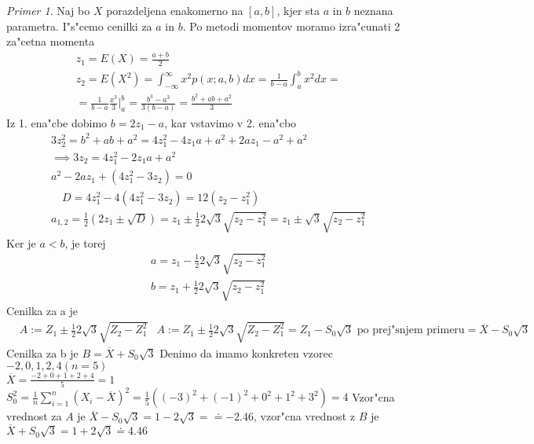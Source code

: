 \documentclass[a4paper,12pt]{article}
\theoremstyle{definition}
\theoremstyle{remark}
\newtheorem*{ex}{Primer}
\begin{document}
\begin{ex}
    Naj bo $X$ porazdeljena enakomerno na $[a,b]$, kjer sta $a$ in $b$ neznana parametra. I"s"cemo cenilki za $a$
    in $b$. Po metodi momentov moramo izra"cunati 2 za"cetna momenta
    \begin{align*}
        &z_1 = E(X) = \frac{a+b}{2} \\
        &z_2 = E(X^2) = \int_{-\infty}^{\infty} x^2 p(x; a, b) dx = \frac{1}{b-a} \int_{a}^{b} x^2 dx = \\
        &= \frac{1}{b-a} \frac{x^3}{3} \vert_a^b = \frac{b^3-a^3}{3(b-a)} = \frac{b^2 + ab + a^2}{3}
    \end{align*}
    Iz 1. ena"cbe dobimo $b = 2z_1 - a$, kar vstavimo v 2. ena"cbo
    \begin{align*}
        &3z_2^2 = b^2 + ab + a^2 = 4z_1^2 - 4z_1 a + a^2 + 2a z_1 - a^2 + a^2 \\
        &\implies 3z_2 = 4z_1^2 - 2z_1 a + a^2 \\
        &a^2 - 2a z_1 + (4z_1^2 - 3z_2) = 0 \\
        &\quad D = 4z_1^2 - 4(4z_1^2 - 3z_2) = 12(z_2 - z_1^2) \\
        &a_{1,2} = \frac{1}{2} (2z_1 \pm \sqrt{D}) = z_1 \pm \frac{1}{2} 2\sqrt{3} \sqrt{z_2 - z_1^2} =
            z_1 \pm \sqrt{3} \sqrt{z_2 - z_1^2}
    \end{align*}
    Ker je $a < b$, je torej
    \begin{align*}
        &a = z_1 - \frac{1}{2} 2\sqrt{3} \sqrt{z_2 - z_1^2} \\
        &b = z_1 + \frac{1}{2} 2\sqrt{3} \sqrt{z_2 - z_1^2}
    \end{align*}
    Cenilka za a je
    \begin{align*}
        &A := Z_1 \pm \frac{1}{2} 2\sqrt{3} \sqrt{Z_2 - Z_1^2}
        &A := Z_1 \pm \frac{1}{2} 2\sqrt{3} \sqrt{Z_2 - Z_1^2} = Z_1 - S_0 \sqrt{3} \text{ po prej"snjem primeru}
            = \overline{X} - S_0 \sqrt{3}
    \end{align*}
    Cenilka za b je $B = \overline{X} + S_0 \sqrt{3}$
    Denimo da imamo konkreten vzorec $-2, 0, 1, 2, 4 (n=5)$ \\
    $\overline{X} = \frac{-2 + 0 + 1 + 2 + 4}{5} = 1$ \\
    $S_0^2 = \frac{1}{n} \sum_{i=1}^n (X_i - \overline{X})^2 = \frac{1}{5} ((-3)^2 + (-1)^2 + 0^2 + 1^2 + 3^2) = 4$
    Vzor"cna vrednost za $A$ je $\overline{X} - S_0 \sqrt{3} = 1 - 2\sqrt{3} = \doteq -2.46$, vzor"cna
    vrednost z $B$ je $\overline{X} + S_0 \sqrt{3} = 1 + 2\sqrt{3} \doteq 4.46$
\end{ex}
\end{document}
